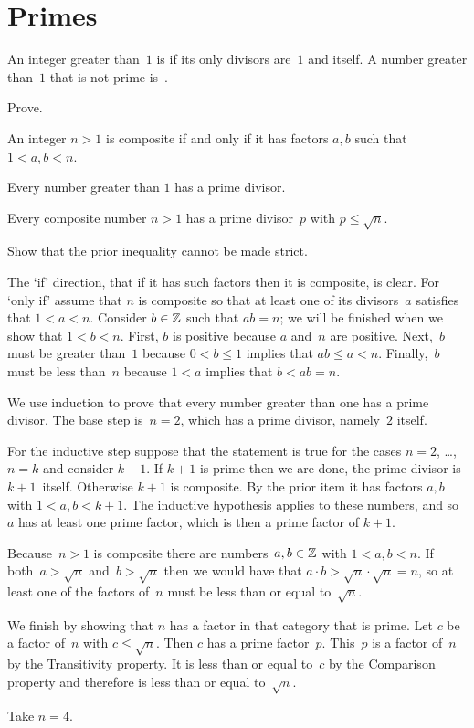 \documentclass{ibl}  %
\begin{document}
\section{Primes}
\begin{df}
An integer greater than~$1$
is  if its only divisors are~$1$ and itself.
A number greater than~$1$ that is not prime is~.  
\end{df}

\begin{ex} Prove.
\begin{exes}
\item An integer $n>1$ is composite if and only if it has factors $a,b$ 
  such that $1<a,b<n$.  
\item Every number greater than $1$ has a prime divisor.
\item Every composite number $n>1$ has a prime divisor~$p$ 
  with $p\leq \sqrt{n}$.
\item Show that the prior inequality cannot be made strict.     
\end{exes}
\begin{ans}
\begin{exes}
\item The `if' direction, that if it has such factors then it is composite,
  is clear.
  For `only if' assume that $n$ is composite so
  that at least one of its divisors~$a$ satisfies that $1<a<n$.
  Consider $b\in\mathbb{Z}$ such that $ab=n$; we will be finished when we show 
  that $1<b<n$.
  First, $b$ is positive because $a$ and~$n$ are positive.
  Next,~$b$ must be greater than~$1$ because $0<b\leq 1$ 
  implies that $ab\leq a<n$.
  Finally,~$b$ must be less than~$n$ because $1<a$ implies that $b<ab=n$. 
\item We use induction to prove that
  every number greater than one has a prime divisor.
  The base step is~$n=2$, which has a prime divisor, namely~$2$ itself.

  For the inductive step suppose that the statement is true for the cases 
  $n=2$, \ldots, $n=k$ and consider $k+1$.
  If $k+1$ is prime then we are done, the prime divisor is $k+1$~itself.
  Otherwise $k+1$ is composite.
  By the prior item it has factors $a,b$ with $1<a,b<k+1$.
  The inductive hypothesis applies to these numbers, and so~$a$ has at
  least one prime factor, which is then a prime factor of $k+1$.
\item Because~$n>1$ is composite there are numbers~$a,b\in\mathbb{Z}$ with
  $1<a,b<n$.
  If both~$a>\sqrt{n}$ and~$b>\sqrt{n}$ then we would have that
  $a\cdot b>\sqrt{n}\cdot\sqrt{n}=n$,
  so at least one of the factors of~$n$ must be less than or equal 
  to~$\sqrt{n}$.

  We finish by showing that $n$ has a factor in that category that is prime.
  Let $c$ be a factor of~$n$ with $c\leq\sqrt{n}$.
  Then $c$ has a prime factor~$p$.
  This~$p$ is a factor of~$n$ by the Transitivity property. 
  It is 
  less than or equal to~$c$ by the Comparison property and therefore
  is less than or equal to~$\sqrt{n}$.  
\item Take $n=4$.
\end{exes}
\end{ans}
\end{ex}
\end{document}
